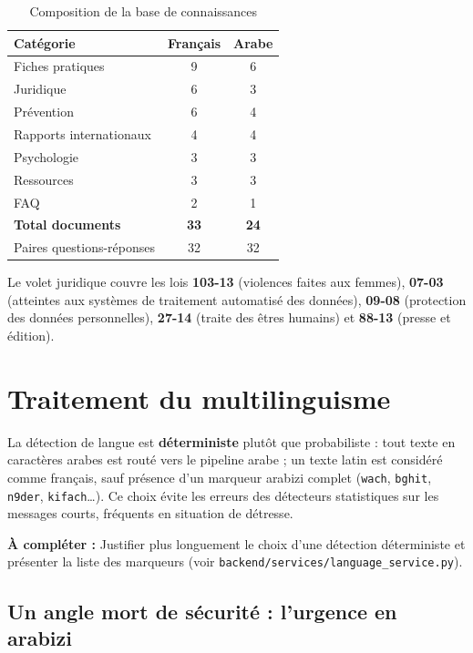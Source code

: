 \documentclass[a4paper,11pt,twoside]{report}
\newcommand{\todo}[1]{%
  \begin{tcolorbox}[colback=yellow!12,colframe=orange!70!black,left=4pt,right=4pt,top=3pt,bottom=3pt]
  \small\textbf{À compléter :} #1
  \end{tcolorbox}}
\begin{document}
\begin{table}[htbp]
\centering
\small
\begin{tabular}{@{}lcc@{}}
\toprule
\textbf{Catégorie} & \textbf{Français} & \textbf{Arabe} \\
\midrule
Fiches pratiques        & 9 & 6 \\
Juridique               & 6 & 3 \\
Prévention              & 6 & 4 \\
Rapports internationaux & 4 & 4 \\
Psychologie             & 3 & 3 \\
Ressources              & 3 & 3 \\
FAQ                     & 2 & 1 \\
\midrule
\textbf{Total documents} & \textbf{33} & \textbf{24} \\
Paires questions-réponses & 32 & 32 \\
\bottomrule
\end{tabular}
\caption{Composition de la base de connaissances}
\label{tab:kb}
\end{table}

Le volet juridique couvre les lois \textbf{103-13} (violences faites aux
femmes), \textbf{07-03} (atteintes aux systèmes de traitement automatisé des
données), \textbf{09-08} (protection des données personnelles), \textbf{27-14}
(traite des êtres humains) et \textbf{88-13} (presse et édition).

\section{Traitement du multilinguisme}

La détection de langue est \textbf{déterministe} plutôt que probabiliste : tout
texte en caractères arabes est routé vers le pipeline arabe ; un texte latin est
considéré comme français, sauf présence d'un marqueur arabizi complet
(\texttt{wach}, \texttt{bghit}, \texttt{n9der}, \texttt{kifach}\ldots). Ce choix
évite les erreurs des détecteurs statistiques sur les messages courts, fréquents
en situation de détresse.

\todo{Justifier plus longuement le choix d'une détection déterministe et
présenter la liste des marqueurs (voir \texttt{backend/services/language\_service.py}).}

\subsection{Un angle mort de sécurité : l'urgence en arabizi}
\label{sec:arabizi}
\end{document}
